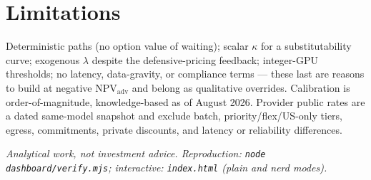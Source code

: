 \documentclass[11pt]{article}
\begin{document}
\section{Limitations}
Deterministic paths (no option value of waiting); scalar $\kappa$ for a substitutability
curve; exogenous $\lambda$ despite the defensive-pricing feedback; integer-GPU thresholds;
no latency, data-gravity, or compliance terms --- these last are reasons to build at
negative $\mathrm{NPV_{adv}}$ and belong as qualitative overrides. Calibration is
order-of-magnitude, knowledge-based as of August 2026. Provider public rates are a dated
same-model snapshot and exclude batch, priority/flex/US-only tiers, egress, commitments,
private discounts, and latency or reliability differences.

\vspace{1em}\noindent\emph{Analytical work, not investment advice. Reproduction:
\texttt{node dashboard/verify.mjs}; interactive:
\texttt{index.html} (plain and nerd modes).}
\end{document}
